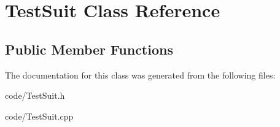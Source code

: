 \hypertarget{class_test_suit}{}\section{Test\+Suit Class Reference}
\label{class_test_suit}
\subsection*{Public Member Functions}
\begin{DoxyCompactItemize}
\end{DoxyCompactItemize}


The documentation for this class was generated from the following files\+:\begin{DoxyCompactItemize}
\item 
code/Test\+Suit.\+h\item 
code/Test\+Suit.\+cpp\end{DoxyCompactItemize}
